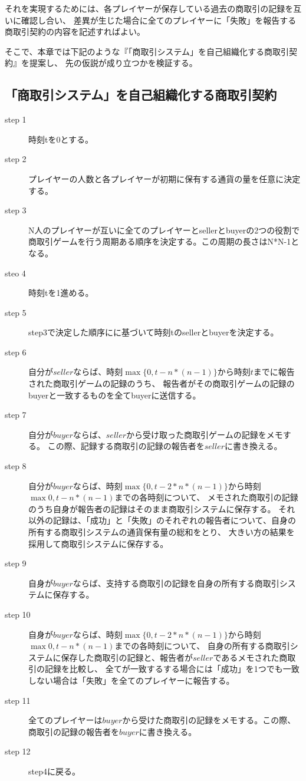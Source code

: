 それを実現するためには、各プレイヤーが保存している過去の商取引の記録を互いに確認し合い、
差異が生じた場合に全てのプレイヤーに「失敗」を報告する商取引契約の内容を記述すればよい。

そこで、本章では下記のような『「商取引システム」を自己組織化する商取引契約』を提案し、
先の仮説が成り立つかを検証する。

\subsection{「商取引システム」を自己組織化する商取引契約}
\begin{description}
  \item[step 1] 時刻tを0とする。
  \item[step 2] プレイヤーの人数と各プレイヤーが初期に保有する通貨の量を任意に決定する。
  \item[step 3] N人のプレイヤーが互いに全てのプレイヤーとsellerとbuyerの2つの役割で商取引ゲームを行う周期ある順序を決定する。この周期の長さはN*N-1となる。
  \item[steo 4] 時刻tを1進める。
  \item[step 5] step3で決定した順序にに基づいて時刻tのsellerとbuyerを決定する。
  \item[step 6] 自分が$seller$ならば、時刻$\max\{0, t-n*(n-1)\}$から時刻$t$までに報告された商取引ゲームの記録のうち、
    報告者がその商取引ゲームの記録のbuyerと一致するものを全てbuyerに送信する。
  \item[step 7] 自分が$buyer$ならば、$seller$から受け取った商取引ゲームの記録をメモする。
    この際、記録する商取引の記録の報告者を$seller$に書き換える。
  \item[step 8] 自分が$buyer$ならば、時刻$\max\{0, t-2*n*(n-1)\}$から時刻$\max{0, t-n*(n-1)}$までの各時刻について、
    メモされた商取引の記録のうち自身が報告者の記録はそのまま商取引システムに保存する。
    それ以外の記録は、「成功」と「失敗」のそれぞれの報告者について、自身の所有する商取引システムの通貨保有量の総和をとり、
    大きい方の結果を採用して商取引システムに保存する。
  \item[step 9] 自身が$buyer$ならば、支持する商取引の記録を自身の所有する商取引システムに保存する。
  \item[step 10] 自身が$buyer$ならば、時刻$\max\{0, t-2*n*(n-1)\}$から時刻$\max{0, t-n*(n-1)}$までの各時刻について、
    自身の所有する商取引システムに保存した商取引の記録と、報告者が$seller$であるメモされた商取引の記録を比較し、
    全てが一致するする場合には「成功」を1つでも一致しない場合は「失敗」を全てのプレイヤーに報告する。
  \item[step 11] 全てのプレイヤーは$buyer$から受けた商取引の記録をメモする。この際、商取引の記録の報告者を$buyer$に書き換える。
  \item[step 12] step4に戻る。
\end{description}

